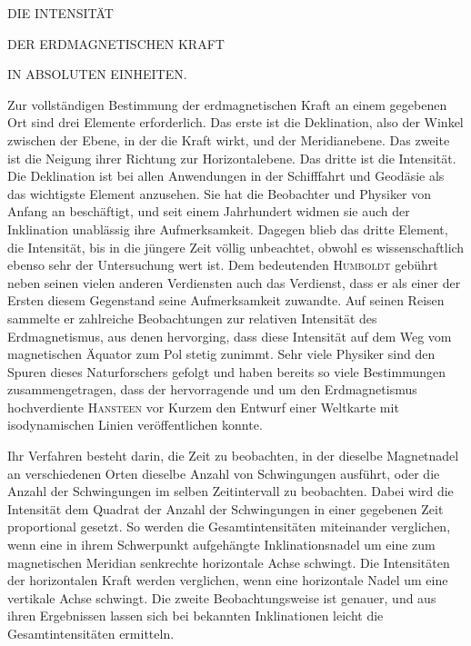 \renewcommand{\Article}[1]{\par\medskip\Needspace{4\baselineskip}\pdfbookmark[1]{Art. #1}{magnetism-art-#1}\centerline{\textbf{#1.}}\nobreak\smallskip}
\par\medskip
\centerline{DIE INTENSITÄT}
\centerline{DER ERDMAGNETISCHEN KRAFT}
\centerline{IN ABSOLUTEN EINHEITEN.}
\medskip
Zur vollständigen Bestimmung der erdmagnetischen Kraft an einem gegebenen Ort sind drei Elemente erforderlich. Das erste ist die Deklination, also der Winkel zwischen der Ebene, in der die Kraft wirkt, und der Meridianebene. Das zweite ist die Neigung ihrer Richtung zur Horizontalebene. Das dritte ist die Intensität. Die Deklination ist bei allen Anwendungen in der Schifffahrt und Geodäsie als das wichtigste Element anzusehen. Sie hat die Beobachter und Physiker von Anfang an beschäftigt, und seit einem Jahrhundert widmen sie auch der Inklination unablässig ihre Aufmerksamkeit. Dagegen blieb das dritte Element, die Intensität, bis in die jüngere Zeit völlig unbeachtet, obwohl es wissenschaftlich ebenso sehr der Untersuchung wert ist. Dem bedeutenden \textsc{Humboldt} gebührt neben seinen vielen anderen Verdiensten auch das Verdienst, dass er als einer der Ersten diesem Gegenstand seine Aufmerksamkeit zuwandte. Auf seinen Reisen sammelte er zahlreiche Beobachtungen zur relativen Intensität des Erdmagnetismus, aus denen hervorging, dass diese Intensität auf dem Weg vom magnetischen Äquator zum Pol stetig zunimmt. Sehr viele Physiker sind den Spuren dieses Naturforschers gefolgt und haben bereits so viele Bestimmungen zusammengetragen, dass der hervorragende und um den Erdmagnetismus hochverdiente \textsc{Hansteen} vor Kurzem den Entwurf einer Weltkarte mit isodynamischen Linien veröffentlichen konnte.

Ihr Verfahren besteht darin, die Zeit zu beobachten, in der dieselbe Magnetnadel an verschiedenen Orten dieselbe Anzahl von Schwingungen ausführt, oder die Anzahl der Schwingungen im selben Zeitintervall zu beobachten. Dabei wird die Intensität dem Quadrat der Anzahl der Schwingungen in einer gegebenen Zeit proportional gesetzt. So werden die Gesamtintensitäten miteinander verglichen, wenn eine in ihrem Schwerpunkt aufgehängte Inklinationsnadel um eine zum magnetischen Meridian senkrechte horizontale Achse schwingt. Die Intensitäten der horizontalen Kraft werden verglichen, wenn eine horizontale Nadel um eine vertikale Achse schwingt. Die zweite Beobachtungsweise ist genauer, und aus ihren Ergebnissen lassen sich bei bekannten Inklinationen leicht die Gesamtintensitäten ermitteln.

